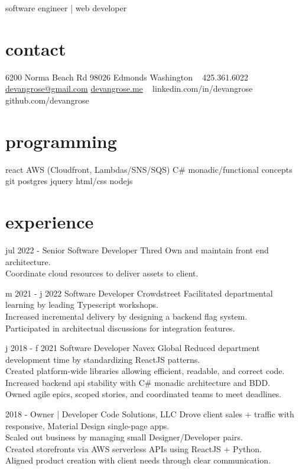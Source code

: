 \documentclass[]{friggeri-cv}
\begin{document}
       { software engineer | web developer }




\begin{aside}
  \section{contact}
    6200 Norma Beach Rd
    98026 Edmonds
    Washington
    ~
    425.361.6022
    \href{mailto:devangrose@gmail.com}{devangrose@gmail.com}
    \href{http://devangrose.me}{devangrose.me}
    ~
    linkedin.com/in/devangrose
    github.com/devangrose
  \section{programming}
    react
    AWS (Cloudfront, Lambdas/SNS/SQS)
    C\#
    monadic/functional concepts
    git
    postgres
    jquery
    html/css
    nodejs

\end{aside}

\section{experience}

\begin{entrylist}
  \entry
    {jul 2022 -}
    {Senior Software Developer}
    {Thred}
    {
      Own and maintain front end architecture. \\
      Coordinate cloud resources to deliver assets to client. \\
    }


  \entry 
    {m 2021 - j 2022}
    {Software Developer}
    {Crowdstreet}
    {
    Facilitated departmental learning by leading Typescript workshops.\\
    Increased incremental delivery by designing a backend flag system. \\
    Participated in architectual discussions for integration features.
    }
  

  \entry 
    {j 2018 - f 2021}
    {Software Developer}
    {Navex Global}
    {
    Reduced department development time by standardizing ReactJS patterns.\\
    Created platform-wide libraries allowing efficient, readable, and correct code.\\
    Increased backend api stability with C\# monadic architecture and BDD.\\
    Owned agile epics, scoped stories, and coordinated teams to meet deadlines.
    }
  
  \entry 
    {2018 - }
    {Owner | Developer}
    {Code Solutions, LLC}
    {
    Drove client sales + traffic with responsive, Material Design single-page apps. \\
    Scaled out business by managing small Designer/Developer pairs.\\
    Created storefronts via AWS serverless APIs using ReactJS + Python. \\
    Aligned product creation with client needs through clear communication.}

\end{entrylist}
\end{document}
